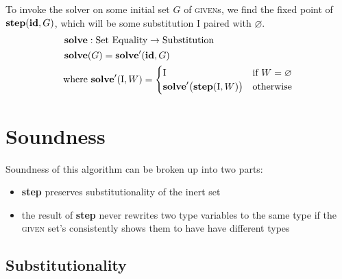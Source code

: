 \documentclass[10pt, letterpaper, oneside]{article}
\newcommand{\inertset}{\text{I}}
\begin{document}
To invoke the solver on some initial set \(G\) of \textsc{given}s, we find the fixed point of \(\text{\bf step}(\text{\bf id}, G)\), which will be some substitution \(\inertset\) paired with \(\varnothing\).
\begin{align*}
  \text{\bf solve} &: \text{Set}~\text{Equality} \to \text{Substitution}\\
  \text{\bf solve}&(G) = \text{\bf solve}^\prime(\text{\bf id}, G)\\
  \text{where}&~\text{\bf solve}^\prime(\inertset, W) =
    \begin{cases}
      \inertset & \text{if } W = \varnothing\\
      \text{\bf solve}^\prime\big(\text{\bf step}(\inertset, W)\big) & \text{otherwise}
    \end{cases}
\end{align*}

\section{Soundness}

Soundness of this algorithm can be broken up into two parts:

\begin{itemize}
\item \textbf{step} preserves substitutionality of the inert set
\item the result of \textbf{step} never rewrites two type variables to the same type if the \textsc{given} set's  consistently shows them to have have different types
\end{itemize}

\subsection{Substitutionality}
\end{document}
